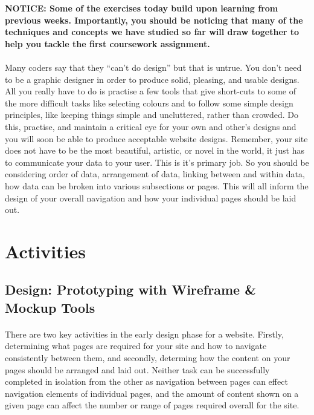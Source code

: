 \documentclass[10pt, a4paper]{article}
\begin{document}
\begin{framed}
{\bf{NOTICE:}  Some of the exercises today build upon learning from previous weeks. Importantly, you should be noticing that many of the techniques and concepts we have studied so far will draw together to help you tackle the first coursework assignment.}
\end{framed}


\paragraph{} Many coders say that they ``can't do design'' but that is untrue. You don't need to be a graphic designer in order to produce solid, pleasing, and usable designs. All you really have to do is practise a few tools that give short-cuts to some of the more difficult tasks like selecting colours and to follow some simple design principles, like keeping things simple and uncluttered, rather than crowded. Do this, practise, and maintain a critical eye for your own and other's designs and you will soon be able to produce acceptable website designs. Remember, your site does not have to be the most beautiful, artistic, or novel in the world, it just has to communicate your data to your user. This is it's primary job. So you should be considering order of data, arrangement of data, linking between and within data, how data can be broken into various subsections or pages. This will all inform the design of your overall navigation and how your individual pages should be laid out. 

\section{Activities}

\subsection{Design: Prototyping with Wireframe \& Mockup Tools}
\paragraph{} There are two key activities in the early design phase for a website. Firstly, determining what pages are required for your site and how to navigate consistently between them, and secondly, determing how the content on your pages should be arranged and laid out. Neither task can be successfully completed in isolation from the other as navigation between pages can effect navigation elements of individual pages, and the amount of content shown on a given page can affect the number or range of pages required overall for the site.
\end{document}
